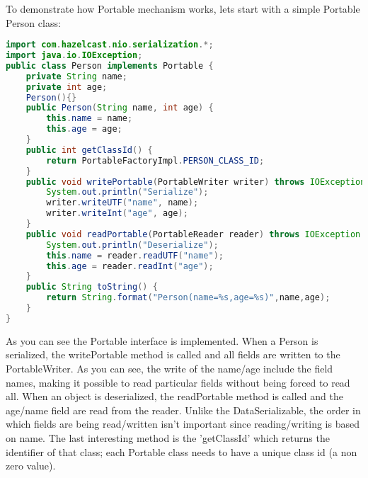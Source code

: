 To demonstrate how Portable mechanism works, lets start with a simple Portable Person class: 
\begin{lstlisting}[language=java]
import com.hazelcast.nio.serialization.*;
import java.io.IOException;
public class Person implements Portable {
    private String name;
    private int age;
    Person(){}
    public Person(String name, int age) {
        this.name = name;
        this.age = age;
    }
    public int getClassId() {
        return PortableFactoryImpl.PERSON_CLASS_ID;
    }
    public void writePortable(PortableWriter writer) throws IOException {
        System.out.println("Serialize");
        writer.writeUTF("name", name);
        writer.writeInt("age", age);
    }
    public void readPortable(PortableReader reader) throws IOException {
        System.out.println("Deserialize");
        this.name = reader.readUTF("name");
        this.age = reader.readInt("age");
    }
    public String toString() {
        return String.format("Person(name=%s,age=%s)",name,age);
    }
}
\end{lstlisting}
As you can see the Portable interface is implemented. When a Person is serialized, the writePortable method is called and all fields are written to the PortableWriter. As you can see, the write of the name/age include the field names, making it possible to read particular fields without being forced to read all. When an object is deserialized, the readPortable method is called and the age/name field are read from the reader. Unlike the DataSerializable, the order in which fields are being read/written isn't important since reading/writing is based  on name. The last interesting method is the 'getClassId' which returns the identifier of that class; each Portable class needs to have a unique class id (a non zero value).

